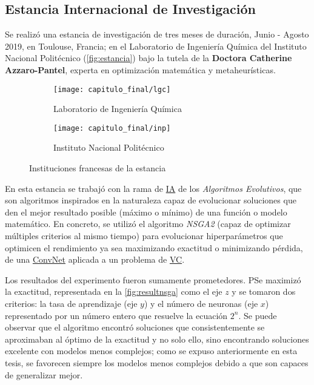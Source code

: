 \subsection{Estancia Internacional de Investigación}

Se realizó una estancia de investigación de tres meses de duración, Junio -
Agosto 2019, en Toulouse, Francia; en el Laboratorio de Ingeniería Química del
Instituto Nacional Politécnico (\autoref{fig:estancia}) bajo la tutela de la
\textbf{Doctora Catherine Azzaro-Pantel}, experta en optimización matemática y
metaheurísticas.

\begin{figure}[H]
    \centering
    \begin{subfigure}{.49\textwidth}
        \centering
        \texttt{[image: capitulo\_final/lgc]}
        \caption{Laboratorio de Ingeniería Química}
    \end{subfigure}%
    \begin{subfigure}{.5\textwidth}
        \centering
        \texttt{[image: capitulo\_final/inp]}
        \caption{Instituto Nacional Politécnico}
    \end{subfigure}
    \caption{Instituciones francesas de la estancia}\label{fig:estancia}
\end{figure}

En esta estancia se trabajó con la rama de \hyperlink{abbr}{IA} de los
\emph{Algoritmos Evolutivos}, que son algoritmos inspirados en la naturaleza
capaz de evolucionar soluciones que den el mejor resultado posible (máximo o
mínimo) de una función o modelo matemático. En concreto, se utilizó el algoritmo
\emph{NSGA2} (capaz de optimizar múltiples criterios al mismo tiempo) para
evolucionar hiperparámetros que optimicen el rendimiento ya sea maximizando
exactitud o minimizando pérdida, de una \hyperlink{abbr}{ConvNet} aplicada a un
problema de \hyperlink{abbr}{VC}.

Los resultados del experimento fueron sumamente prometedores. PSe maximizó la
exactitud, representada en la \autoref{fig:resultnsga} como el eje \(z\) y se
tomaron dos criterios: la tasa de aprendizaje (eje \(y\)) y el número de neuronas
(eje \(x\)) representado por un número entero que resuelve la ecuación \(2^{n}\). Se
puede observar que el algoritmo encontró soluciones que consistentemente se
aproximaban al óptimo de la exactitud y no solo ello, sino encontrando
soluciones excelente con modelos menos complejos; como se expuso anteriormente
en esta tesis, se favorecen siempre los modelos menos complejos debido a que son
capaces de generalizar mejor.

